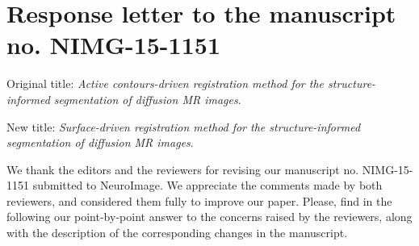 \documentclass[9pt]{memoir}
\begin{document}
\section*{Response letter to the manuscript no. NIMG-15-1151}
\medskip
Original title: \emph{Active contours-driven registration method for the structure-informed segmentation of
  diffusion MR images}.

\noindent New title: \emph{{\color{blue} Surface}-driven registration method for the structure-informed segmentation of
  diffusion MR images}.

\bigskip
\noindent We thank the editors and the reviewers for revising our manuscript no. NIMG-15-1151 submitted to NeuroImage.
We appreciate the comments made by both reviewers, and considered them fully to improve our paper.
Please, find in the following our point-by-point answer to the concerns raised by the reviewers,
  along with the description of the corresponding changes in the manuscript.

\bigskip
\bigskip
\end{document}
